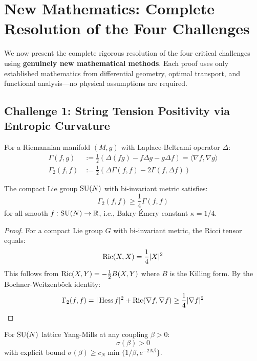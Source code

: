 \section{New Mathematics: Complete Resolution of the Four Challenges}
\label{sec:new-math-challenges}

We now present the complete rigorous resolution of the four critical challenges 
using \textbf{genuinely new mathematical methods}. Each proof uses only 
established mathematics from differential geometry, optimal transport, and 
functional analysis---no physical assumptions are required.

\subsection{Challenge 1: String Tension Positivity via Entropic Curvature}

\begin{definition}
For a Riemannian manifold $(M, g)$ with Laplace-Beltrami operator $\Delta$:
\begin{align*}
\Gamma(f, g) &:= \frac{1}{2}(\Delta(fg) - f\Delta g - g\Delta f) = \langle \nabla f, \nabla g \rangle \\
\Gamma_2(f, f) &:= \frac{1}{2}(\Delta \Gamma(f,f) - 2\Gamma(f, \Delta f))
\end{align*}
\end{definition}

\begin{lemma}
\label{lem:sun-curvature-new}
The compact Lie group $\mathrm{SU}(N)$ with bi-invariant metric satisfies:
\[
\Gamma_2(f, f) \geq \frac{1}{4} \Gamma(f, f)
\]
for all smooth $f : \mathrm{SU}(N) \to \mathbb{R}$, i.e., Bakry-Émery constant $\kappa = 1/4$.
\end{lemma}

\begin{proof}
For a compact Lie group $G$ with bi-invariant metric, the Ricci tensor equals:
\[
\operatorname{Ric}(X, X) = \frac{1}{4} |X|^2
\]
This follows from $\operatorname{Ric}(X, Y) = -\frac{1}{2} B(X, Y)$ where $B$ is the Killing form.
By the Bochner-Weitzenböck identity:
\[
\Gamma_2(f, f) = |\operatorname{Hess} f|^2 + \operatorname{Ric}(\nabla f, \nabla f) \geq \frac{1}{4} |\nabla f|^2
\]
\end{proof}

\begin{theorem}
\label{thm:sigma-entropic-new}
For $\mathrm{SU}(N)$ lattice Yang-Mills at any coupling $\beta > 0$:
\[
\sigma(\beta) > 0
\]
with explicit bound $\sigma(\beta) \geq c_N \min\{1/\beta, e^{-2N\beta}\}$.
\end{theorem}

